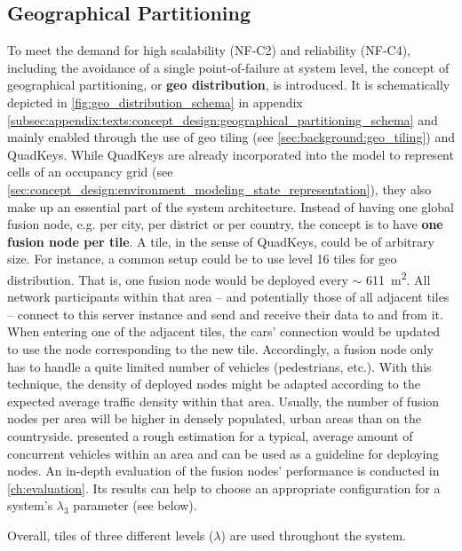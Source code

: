 \subsection{Geographical Partitioning}
\label{subsec:concept_design:geographical_partitioning}
To meet the demand for high scalability (NF-C2) and reliability (NF-C4), including the avoidance of a single point-of-failure at system level, the concept of geographical partitioning, or \textbf{geo distribution}, is introduced. It is schematically depicted in \cref{fig:geo_distribution_schema} in appendix \cref{subsec:appendix:texts:concept_design:geographical_partitioning_schema} and mainly enabled through the use of geo tiling (see \cref{sec:background:geo_tiling}) and QuadKeys. While QuadKeys are already incorporated into the model to represent cells of an occupancy grid (see \cref{sec:concept_design:environment_modeling_state_representation}), they also make up an essential part of the system architecture. Instead of having one global fusion node, e.g. per city, per district or per country, the concept is to have \textbf{one fusion node per tile}. A tile, in the sense of QuadKeys, could be of arbitrary size. For instance, a common setup could be to use level 16 tiles for geo distribution. That is, one fusion node would be deployed every $\sim$ \SI{611}{\square\meter}. All network participants within that area – and potentially those of all adjacent tiles – connect to this server instance and send and receive their data to and from it. When entering one of the adjacent tiles, the cars' connection would be updated to use the node corresponding to the new tile. Accordingly, a fusion node only has to handle a quite limited number of vehicles (pedestrians, etc.). With this technique, the density of deployed nodes might be adapted according to the expected average traffic density within that area. Usually, the number of fusion nodes per area will be higher in densely populated, urban areas than on the countryside.  presented a rough estimation for a typical, average amount of concurrent vehicles within an area and can be used as a guideline for deploying nodes. An in-depth evaluation of the fusion nodes' performance is conducted in \cref{ch:evaluation}. Its results can help to choose an appropriate configuration for a system's $\lambda_3$ parameter (see below).
\par
\bigskip

Overall, tiles of three different levels ($\lambda$) are used throughout the system.

